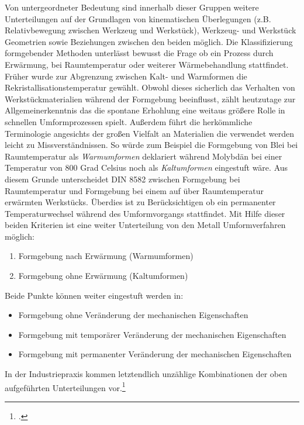 \documentclass[12pt,a4paper,parskip]{scrartcl}
\begin{document}
Von untergeordneter Bedeutung sind innerhalb dieser Gruppen  weitere Unterteilungen auf der Grundlagen von kinematischen Überlegungen (z.B. Relativbewegung zwischen Werkzeug und Werkstück), Werkzeug- und Werkstück Geometrien sowie Beziehungen zwischen den beiden möglich. Die Klassifizierung formgebender Methoden unterlässt bewusst die Frage ob ein Prozess durch Erwärmung, bei Raumtemperatur oder weiterer Wärmebehandlung stattfindet. Früher  wurde zur Abgrenzung zwischen Kalt- und Warmformen die Rekristallisationstemperatur gewählt. Obwohl dieses sicherlich das Verhalten  von Werkstückmaterialien während der Formgebung beeinflusst, zählt heutzutage zur Allgemeinerkenntnis das die spontane Erhohlung  eine weitaus größere Rolle in schnellen Umformprozessen spielt. Außerdem führt die herkömmliche Terminologie angesichts der großen Vielfalt  an Materialien die verwendet werden leicht zu Missverständnissen. So würde zum Beispiel die Formgebung von Blei bei Raumtemperatur als \emph{Warmumformen} deklariert während Molybdän bei einer Temperatur von 800 Grad Celsius noch als \emph{Kaltumformen} eingestuft wäre. Aus diesem Grunde unterscheidet DIN 8582 zwischen Formgebung bei Raumtemperatur und Formgebung bei einem auf über Raumtemperatur erwärmten Werkstücks. Überdies ist zu Berücksichtigen ob ein permanenter Temperaturwechsel während des Umformvorgangs stattfindet. Mit Hilfe dieser beiden Kriterien ist eine weiter Unterteilung von den Metall Umformverfahren möglich:

\begin{enumerate}
\item Formgebung nach Erwärmung (Warmumformen)
\item Formgebung ohne Erwärmung (Kaltumformen)
\end{enumerate}

Beide Punkte können weiter eingestuft werden in:

\begin{itemize}
\item Formgebung ohne Veränderung der mechanischen Eigenschaften
\item Formgebung mit temporärer Veränderung der mechanischen Eigenschaften
\item Formgebung mit permanenter Veränderung der mechanischen Eigenschaften
\end{itemize}

In der Industriepraxis kommen letztendlich unzählige Kombinationen der oben aufgeführten Unterteilungen vor.\footcite[Vgl.][2.1ff]{kl}
\end{document}
